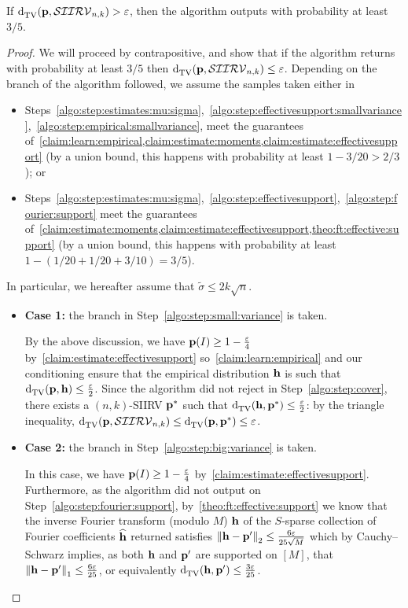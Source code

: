 \begin{lemma}\label{lemma:soundness}
  If $ \totalvardist{\p}{\classksiirv[n]{k}} > \eps$, then the algorithm outputs \reject with probability at least $3/5$.
\end{lemma}
\begin{proof}
We will proceed by contrapositive, and show that if the algorithm returns \accept with probability at least $3/5$ then $ \totalvardist{\p}{\classksiirv[n]{k}} \leq \eps$. 
Depending on the branch of the algorithm followed, we assume the samples taken either in
 \begin{itemize}
    \item Steps~\ref{algo:step:estimates:mu:sigma},~\ref{algo:step:effectivesupport:smallvariance},~\ref{algo:step:empirical:smallvariance}, meet the guarantees of~\cref{claim:learn:empirical,claim:estimate:moments,claim:estimate:effectivesupport} (by a union bound, this happens with probability at least $1-3/20 > 2/3$); or
    \item Steps~\ref{algo:step:estimates:mu:sigma},~\ref{algo:step:effectivesupport},~\ref{algo:step:fourier:support} meet the guarantees of~\cref{claim:estimate:moments,claim:estimate:effectivesupport,theo:ft:effective:support} (by a union bound, this happens with probability at least $1-(1/20+1/20+3/10)=3/5$).
 \end{itemize}
In particular, we hereafter assume that $\widetilde{\sigma} \leq 2k\sqrt{n}$.

\begin{itemize}
\item \textbf{Case 1:} the branch in Step~\ref{algo:step:small:variance} is taken.

  By the above discussion, we have $\p(I)\geq 1 - \frac{\eps}{4}$ by~\cref{claim:estimate:effectivesupport} so~\cref{claim:learn:empirical} and our conditioning ensure that the empirical distribution $\h$ is such that $\totalvardist{\p}{\h} \leq \frac{\eps}{2}$. Since the algorithm did not reject in Step~\ref{algo:step:cover}, there exists a $(n,k)$-SIIRV $\p^\ast$ such that $\totalvardist{\h}{\p^\ast} \leq \frac{\eps}{2}$: by the triangle inequality, $ \totalvardist{\p}{\classksiirv[n]{k}} \leq \totalvardist{\p}{\q^\ast} \leq \eps$.


\item \textbf{Case 2:} the branch in Step~\ref{algo:step:big:variance} is taken.

  In this case, we have $\p(I)\geq 1 - \frac{\eps}{4}$ by~\cref{claim:estimate:effectivesupport}. Furthermore, as the algorithm did not output \reject on Step~\ref{algo:step:fourier:support}, by~\cref{theo:ft:effective:support} we know that the inverse Fourier transform (modulo $M$) $\h$ of the $S$-sparse collection of Fourier coefficients $\fourier{\h}$ returned satisfies
  $
       \normtwo{\h-\p'} \leq \frac{6\eps}{25\sqrt{M}}
  $ 
  which by Cauchy--Schwarz implies, as both $\h$ and $\p'$ are supported on $[M]$, that $\normone{\h-\p'}\leq \frac{6\eps}{25}$, or equivalently $\totalvardist{\h}{\p'}\leq \frac{3\eps}{25}$.
  

\end{itemize}
\end{proof}
